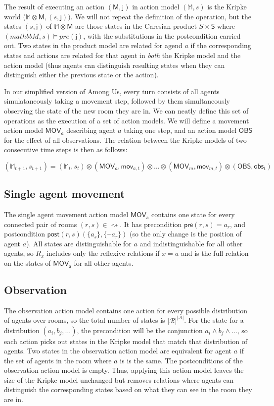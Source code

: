 \documentclass[a4paper]{scrartcl}
\begin{document}
The result of executing an action $(\mathsf{M}, \mathsf{j})$ in action model $(\mathbb{M}, s)$ is the Kripke world ($\mathbb{M} \otimes \mathsf{M}, (s, \mathsf{j}))$. We will not repeat the definition of the operation, but the states $(s, \mathsf{j})$ of $\mathbb{M} \otimes \mathsf{M}$ are those states in the Caresian product $S \times \mathsf{S}$ where $(mathbb{M}, s) \vDash pre(\mathsf{j})$, with the substitutions in the postcondition carried out. Two states in the product model are related for agend $a$ if the corresponding states and actions are related for that agent in \emph{both} the Kripke model and the action model (thus agents can distinguish resulting states when they can distinguish either the previous state or the action). 

In our simplified version of Among Us, every turn consists of all agents simulataneously taking a movement step, followed by them simultaneously observing the state of the new room they are in. We can neatly define this set of operations as the execution of a set of action models. We will define a movement action model $\mathsf{MOV}_a$ describing agent $a$ taking one step, and an action model $\mathsf{OBS}$ for the effect of all observations. The relation between the Kripke models of two consecutive time steps is then as follows:

$$(\mathbb{M}_{t+1}, s_{t+1}) = (\mathbb{M}_{t}, s_{t}) \otimes (\mathsf{MOV}_{a}, \mathsf{mov}_{a,t}) \otimes \dots \otimes (\mathsf{MOV}_{m}, \mathsf{mov}_{m,t}) \otimes (\mathsf{OBS}, \mathsf{obs}_{t}) $$


\subsection*{Single agent movement}
The single agent movement action model $\mathsf{MOV_a}$ contains one state for every connected pair of rooms $(r, s) \in \rightsquigarrow$. It has precondition $\mathsf{pre}(r,s) = a_r$, and postcondition $\mathsf{post}(r,s) (\{a_s\}, \{\neg a_r\})$ (so the only change is the position of agent $a$). All states are distinguishable for $a$ and indistinguishable for all other agents, so $R_x$ includes only the reflexive relations if $x=a$ and is the full relation on the states of $\mathsf{MOV_a}$ for all other agents. 

\subsection*{Observation}
The observation action model contains one action for every possible distribution of agents over rooms, so the total number of states is $|\mathcal{R}| ^ {|\mathcal{A}|}$. For the state for a distribution $(a_i, b_j, \dots)$, the precondition will be the conjunction $a_i \land b_j \land \dots$, so each action picks out states in the Kripke model that match that distribution of agents. Two states in the observation action model are equivalent for agent $a$ if the set of agents in the room where $a$ is is the same. The postconditions of the observation action model is empty. Thus, applying this action model leaves the size of the Kripke model unchanged but removes relations where agents can distinguish the corresponding states based on what they can see in the room they are in. 
\end{document}
